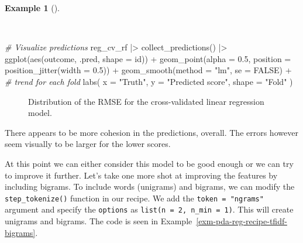 \documentclass[
  letterpaper,
  DIV=11,
  numbers=noendperiod]{scrreprt}
\newenvironment{Shaded}{\begin{snugshade}}{\end{snugshade}}
\newcommand{\AttributeTok}[1]{\textcolor[rgb]{0.00,0.00,0.00}{#1}}
\newcommand{\CommentTok}[1]{\textcolor[rgb]{0.00,0.00,0.00}{\textit{#1}}}
\newcommand{\ConstantTok}[1]{\textcolor[rgb]{0.00,0.00,0.00}{#1}}
\newcommand{\FloatTok}[1]{\textcolor[rgb]{0.00,0.00,0.00}{#1}}
\newcommand{\FunctionTok}[1]{\textcolor[rgb]{0.00,0.00,0.00}{#1}}
\newcommand{\NormalTok}[1]{\textcolor[rgb]{0.00,0.00,0.00}{#1}}
\newcommand{\SpecialCharTok}[1]{\textcolor[rgb]{0.00,0.00,0.00}{#1}}
\newcommand{\StringTok}[1]{\textcolor[rgb]{0.00,0.00,0.00}{#1}}
\theoremstyle{definition}
\newtheorem{example}{Example}[chapter]
\theoremstyle{remark}
\begin{document}
\begin{example}[]\protect\hypertarget{exm-pda-reg-lr-eval-rmse}{}\label{exm-pda-reg-lr-eval-rmse}

~

\begin{Shaded}
\begin{Highlighting}[]
\CommentTok{\# Visualize predictions}
\NormalTok{reg\_cv\_rf }\SpecialCharTok{|\textgreater{}}
  \FunctionTok{collect\_predictions}\NormalTok{() }\SpecialCharTok{|\textgreater{}}
  \FunctionTok{ggplot}\NormalTok{(}\FunctionTok{aes}\NormalTok{(outcome, .pred, }\AttributeTok{shape =}\NormalTok{ id)) }\SpecialCharTok{+}
  \FunctionTok{geom\_point}\NormalTok{(}\AttributeTok{alpha =} \FloatTok{0.5}\NormalTok{, }\AttributeTok{position =} \FunctionTok{position\_jitter}\NormalTok{(}\AttributeTok{width =} \FloatTok{0.5}\NormalTok{)) }\SpecialCharTok{+}
  \FunctionTok{geom\_smooth}\NormalTok{(}\AttributeTok{method =} \StringTok{"lm"}\NormalTok{, }\AttributeTok{se =} \ConstantTok{FALSE}\NormalTok{) }\SpecialCharTok{+} \CommentTok{\# trend for each fold}
  \FunctionTok{labs}\NormalTok{(}
    \AttributeTok{x =} \StringTok{"Truth"}\NormalTok{,}
    \AttributeTok{y =} \StringTok{"Predicted score"}\NormalTok{,}
    \AttributeTok{shape =} \StringTok{"Fold"}
\NormalTok{  )}
\end{Highlighting}
\end{Shaded}

\begin{figure}[H]


\caption{\label{fig-pda-reg-rf-eval-rmse}Distribution of the RMSE for
the cross-validated linear regression model.}

\end{figure}%

\end{example}

There appears to be more cohesion in the predictions, overall. The
errors however seem visually to be larger for the lower scores.

At this point we can either consider this model to be good enough or we
can try to improve it further. Let's take one more shot at improving the
features by including bigrams. To include words (unigrams) and bigrams,
we can modify the \texttt{step\_tokenize()} function in our recipe. We
add the \texttt{token\ =\ "ngrams"} argument and specify the
\texttt{options} as \texttt{list(n\ =\ 2,\ n\_min\ =\ 1)}. This will
create unigrams and bigrams. The code is seen in
Example~\ref{exm-pda-reg-recipe-tfidf-bigrams}.
\end{document}
